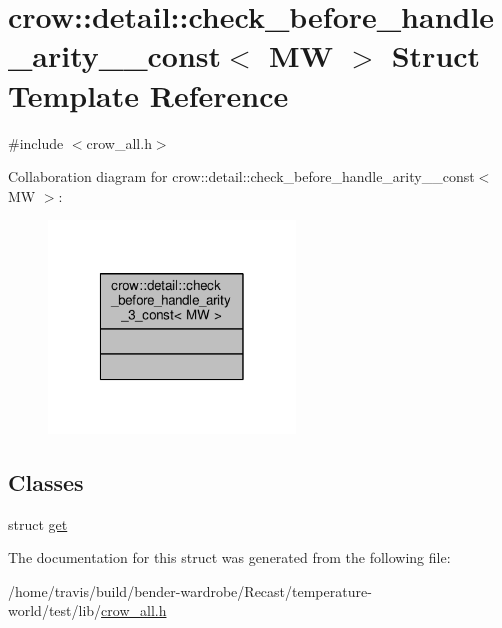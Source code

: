 \hypertarget{structcrow_1_1detail_1_1check__before__handle__arity__3__const}{\section{crow\-:\-:detail\-:\-:check\-\_\-before\-\_\-handle\-\_\-arity\-\_\-\_\-const$<$ M\-W $>$ Struct Template Reference}
\label{structcrow_1_1detail_1_1check__before__handle__arity__3__const}
}


{\ttfamily \#include $<$crow\-\_\-all.\-h$>$}



Collaboration diagram for crow\-:\-:detail\-:\-:check\-\_\-before\-\_\-handle\-\_\-arity\-\_\-\_\-const$<$ M\-W $>$\-:
\nopagebreak
\begin{figure}[H]
\begin{center}
\leavevmode
\includegraphics[width=186pt]{structcrow_1_1detail_1_1check__before__handle__arity__3__const__coll__graph}
\end{center}
\end{figure}
\subsection*{Classes}
\begin{DoxyCompactItemize}
\item 
struct \hyperlink{structcrow_1_1detail_1_1check__before__handle__arity__3__const_1_1get}{get}
\end{DoxyCompactItemize}


The documentation for this struct was generated from the following file\-:\begin{DoxyCompactItemize}
\item 
/home/travis/build/bender-\/wardrobe/\-Recast/temperature-\/world/test/lib/\hyperlink{crow__all_8h}{crow\-\_\-all.\-h}\end{DoxyCompactItemize}
